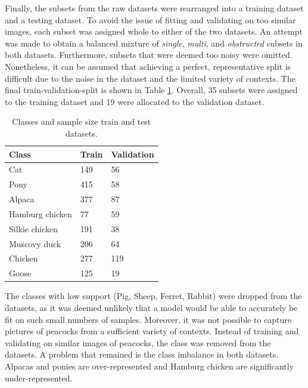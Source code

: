\documentclass{l4proj}
\begin{document}
Finally, the subsets from the raw datasets were rearranged into a training dataset and a testing dataset. To avoid the issue of fitting and validating on too similar images, each subset was assigned whole to either of the two datasets. An attempt was made to obtain a balanced mixture of \textit{single}, \textit{multi}, and \textit{obstructed} subsets in both datasets. Furthermore, subsets that were deemed too noisy were omitted. Nonetheless, it can be assumed that achieving a perfect, representative split is difficult due to the noise in the dataset and the limited variety of contexts. The final train-validation-split is shown in Table \ref{table:train_test_dataset}. Overall, 35 subsets were assigned to the training dataset and 19 were allocated to the validation dataset.

\begin{table}[ht]
  \centering
  \begin{tabular}{@{}lll@{}}
    \toprule
    \textbf{Class}  & \textbf{Train } & \textbf{Validation} \\ \midrule
    Cat             & 149             & 56 \\
    Pony            & 415             & 58 \\
    Alpaca          & 377             & 87 \\
    Hamburg chicken & 77              & 59 \\
    Silkie chicken  & 191             & 38 \\
    Muscovy duck    & 206             & 64 \\
    Chicken         & 277             & 119 \\
    Goose           & 125             & 19 \\ \bottomrule
  \end{tabular}
  \caption{Classes and sample size train and test datasets.}
  \label{table:train_test_dataset}
\end{table}

The classes with low support (Pig, Sheep, Ferret, Rabbit) were dropped from the datasets, as it was deemed unlikely that a model would be able to accurately be fit on such small numbers of samples. Moreover, it was not possible to capture pictures of peacocks from a sufficient variety of contexts. Instead of training and validating on similar images of peacocks, the class was removed from the datasets. A problem that remained is the class imbalance in both datasets. Alpacas and ponies are over-represented and Hamburg chicken are significantly under-represented.
\end{document}
